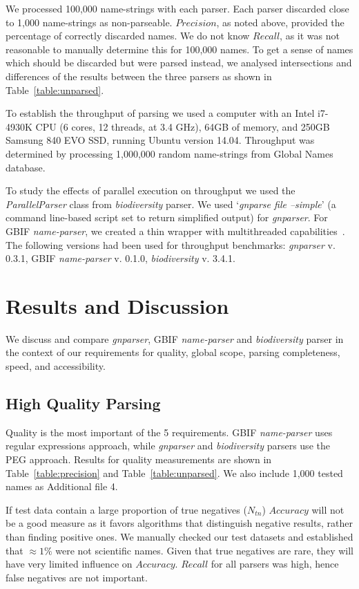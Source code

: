 \documentclass{bmcart}
\begin{document}
We processed 100,000 name-strings with each parser. Each parser discarded close to 1,000 name-strings as non-parseable. $Precision$, as noted above, provided the percentage of correctly discarded names. We do not know $Recall$, as it was not reasonable to manually determine this for 100,000 names. To get a sense of names which should be discarded but were parsed instead, we analysed intersections and differences of the results between the three parsers as shown in Table~\ref{table:unparsed}.

To establish the throughput of parsing we used a computer with an Intel i7-4930K CPU (6 cores, 12 threads, at 3.4 GHz), 64GB of memory, and 250GB Samsung 840 EVO SSD, running Ubuntu version 14.04. Throughput was determined by processing 1,000,000 random name-strings from Global Names database.

To study the effects of parallel execution on throughput we used the \textit{ParallelParser} class from \textit{biodiversity} parser. We used `\textit{gnparse file --simple}' (a command line-based script set to return simplified output) for \textit{gnparser}. For GBIF \textit{name-parser}, we created a thin wrapper with multithreaded capabilities~\cite{gbifparser}. The following versions had been used for throughput benchmarks: \textit{gnparser} v. 0.3.1, GBIF \textit{name-parser} v.  0.1.0, \textit{biodiversity} v. 3.4.1.


\section*{Results and Discussion}\label{sec:discussion}

We discuss and compare \textit{gnparser}, GBIF \textit{name-parser} and \textit{biodiversity} parser in the context of our requirements for quality, global scope, parsing completeness, speed, and accessibility.


\subsection*{High Quality Parsing}

Quality is the most important of the 5 requirements. GBIF \textit{name-parser} uses regular expressions approach, while \textit{gnparser} and \textit{biodiversity} parsers use the PEG approach. Results for quality measurements are shown in Table~\ref{table:precision} and Table~\ref{table:unparsed}. We also include 1,000 tested names as Additional file 4.

If test data contain a large proportion of true negatives ($N_{tn}$) $Accuracy$ will not be a good measure as it favors algorithms that distinguish negative results, rather than finding positive ones. We manually checked our test datasets and established that $\approx1\%$ were not scientific names. Given that true negatives are rare, they will have very limited influence on $Accuracy$. $Recall$ for all parsers was high, hence false negatives are not important.
\end{document}
